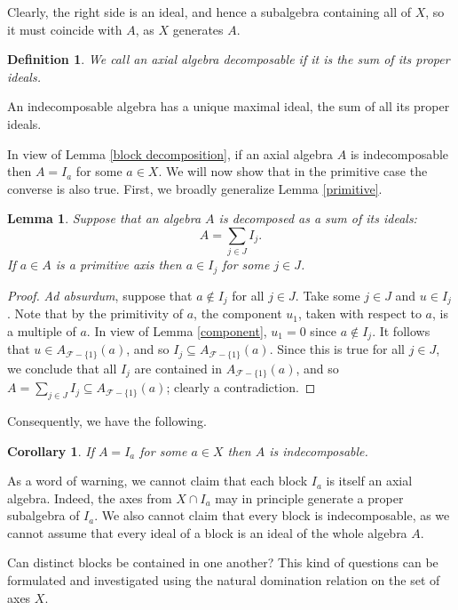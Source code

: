 \documentclass[12pt]{article}
\newtheorem{lemma}[theorem]{Lemma}
\newtheorem{corollary}[theorem]{Corollary}
\newtheorem{definition}[theorem]{Definition}
\newcommand\cF{\mathcal{F}}
\begin{document}
Clearly, the right side is an ideal, and hence a subalgebra containing all of $X$, so 
it must coincide with $A$, as $X$ generates $A$.

\begin{definition}
We call an axial algebra \emph{decomposable} if it is the sum of its proper ideals.
\end{definition}

An indecomposable algebra has a unique maximal ideal, the sum of all its proper 
ideals.

In view of Lemma \ref{block decomposition}, if an axial algebra $A$ is indecomposable 
then $A=I_a$ for some $a\in X$. We will now show that in the primitive case the 
converse is also true. First, we broadly generalize Lemma \ref{primitive}.

\begin{lemma} \label{sum}
Suppose that an algebra $A$ is decomposed as a sum of its ideals:
%
$$
A=\sum_{j\in J}I_j.
$$
%
If $a\in A$ is a primitive axis then $a\in I_j$ for some $j\in J$.
\end{lemma}

\begin{proof}
{\it Ad absurdum}, suppose that $a\notin I_j$ for all $j\in J$. Take some $j\in J$ 
and $u\in I_j$. Note that by the primitivity of $a$, the component $u_1$, taken with 
respect to $a$, is a multiple of $a$. In view of Lemma \ref{component}, $u_1=0$ since 
$a\notin I_j$. It follows that $u\in A_{\cF-\{1\}}(a)$, and so $I_j\subseteq A_{\cF-
\{1\}}(a)$. Since this is true for all $j\in J$, we conclude that all $I_j$ are 
contained in $A_{\cF-\{1\}}(a)$, and so $A=\sum_{j\in J}I_j\subseteq 
A_{\cF-\{1\}}(a)$; clearly a contradiction. 
\end{proof}

Consequently, we have the following.

\begin{corollary}
If $A=I_a$ for some $a\in X$ then $A$ is indecomposable.
\end{corollary}

As a word of warning, we cannot claim that each block $I_a$ is itself an axial 
algebra. Indeed, the axes from $X\cap I_a$ may in principle generate a proper 
subalgebra of $I_a$. We also cannot claim that every block is indecomposable, as we cannot assume that every ideal of a block is an ideal of the whole algebra $A$.

Can distinct blocks be contained in one another? This kind of questions can be 
formulated and investigated using the natural domination relation on the set of axes 
$X$. 
\end{document}
